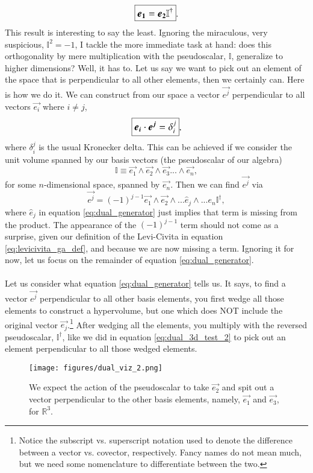 \begin{equation} \label{eq:dual_3d_test_2}
\large\boxed{\vec{e_1} = \vec{e_2} \mathbb{I}^\dagger}.
\end{equation}
This result is interesting to say the least. Ignoring the miraculous, very suspicious, $\mathbb{I}^2 = -1$, I tackle the more immediate task at hand: does this orthogonality by mere multiplication with the pseudoscalar, $\mathbb{I}$, generalize to higher dimensions? Well, it has to. Let us say we want to pick out an element of the space that is perpendicular to all other elements, then we certainly can. Here is how we do it. We can construct from our space a vector $\vec{e^j}$ perpendicular to all vectors $\vec{e_i}$ where $i \neq j$,
\begin{equation} \label{eq:duality_definition}
    \large\boxed{\vec{e_i} \cdot \vec{e^j} = \delta_i^j},
\end{equation}
 where $ \delta_i^j$ is the usual Kronecker delta. This can be achieved if we consider the unit volume spanned by our basis vectors (the pseudoscalar of our algebra) 
\begin{equation}
    \mathbb{I} \equiv \vec{e_1} \wedge \vec{e_2} \wedge \vec{e_3} ... \wedge \vec{e_n},
\end{equation}
for some $n$-dimensional space, spanned by $\vec{e_n}$. Then we can find $\vec{e^j}$ via
\begin{equation}
    \label{eq:dual_generator}
    \vec{e^j} = (-1)^{j-1} \vec{e_1} \wedge \vec{e_2} \wedge ... \hat{e}_j \wedge ... e_{n} \mathbb{I}^\dagger,
\end{equation}
where $\hat{e}_j$ in equation \eqref{eq:dual_generator} just implies that term is missing from the product. The appearance of the $(-1)^{j-1}$ term should not come as a surprise, given our definition of the Levi-Civita in equation \eqref{eq:levicivita_ga_def}, and because we are now missing a term. Ignoring it for now, let us focus on the remainder of equation \eqref{eq:dual_generator}. 
\\ \\ 
Let us consider what equation \eqref{eq:dual_generator} tells us. It says, to find a vector $\vec{e^j}$ perpendicular to all other basis elements, you first wedge all those elements to construct a hypervolume, but one which does NOT include the original vector $\vec{e_j}$.\footnote{Notice the subscript vs. superscript notation used to denote the difference between a vector vs. covector, respectively. Fancy names do not mean much, but we need some nomenclature to differentiate between the two.} After wedging all the elements, you multiply with the reversed pseudoscalar, $\mathbb{I}^\dagger$, like we did in equation \eqref{eq:dual_3d_test_2} to pick out an element perpendicular to all those wedged elements. 
\begin{figure}[H]
    \centering
    \texttt{[image: figures/dual\_viz\_2.png]}
    \caption{We expect the action of the pseudoscalar to take $\vec{e_2}$ and spit out a vector perpendicular to the other basis elements, namely, $\vec{e_1}$ and $\vec{e_3}$, for $\mathbb{R}^3$.  }
    \label{fig:dual}
\end{figure}


